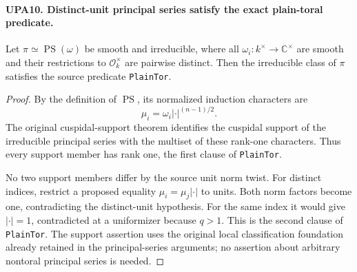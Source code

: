 \paragraph{UPA10. Distinct-unit principal series satisfy the exact plain-toral predicate.}
\label{claim:UPA10}
Let $\pi\simeq\operatorname{PS}(\omega)$ be smooth and
irreducible, where all $\omega_i:k^\times\to\mathbb C^\times$
are smooth and their restrictions to $\mathcal O_k^\times$
are pairwise distinct.  Then the irreducible class of
$\pi$ satisfies the source predicate \texttt{PlainTor}.
\begin{proof}
By the definition of $\operatorname{PS}$, its normalized
induction characters are
\[
              \mu_i=\omega_i|\cdot|^{(n-1)/2}.
 \tag{UPA.14}
\]
The original cuspidal-support theorem identifies the
cuspidal support of the irreducible principal series with
the multiset of these rank-one characters.  Thus every
support member has rank one, the first clause of
\texttt{PlainTor}.

No two support members differ by the source unit norm
twist.  For distinct indices, restrict a proposed equality
$\mu_i=\mu_j|\cdot|$ to units.  Both norm factors become
one, contradicting the distinct-unit hypothesis.
For the same index it would give $|\cdot|=1$, contradicted
at a uniformizer because $q>1$.  This is the second
clause of \texttt{PlainTor}.  The support assertion uses
the original local classification foundation already
retained in the principal-series arguments; no assertion
about arbitrary nontoral principal series is needed.
\end{proof}

